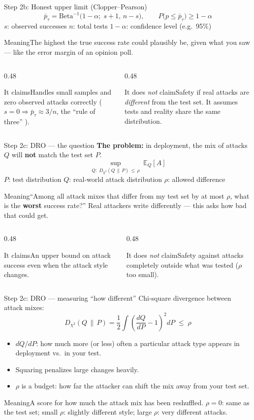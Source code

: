 \documentclass[aspectratio=169,11pt]{beamer}
\newcommand{\pbar}{\bar p_\tau}
\newcommand{\plain}[1]{\begin{block}{Meaning}#1\end{block}}
\newcommand{\claims}[2]{%
  \begin{columns}[T]
    \begin{column}{0.48\textwidth}
      \begin{exampleblock}{It claims}#1\end{exampleblock}
    \end{column}
    \begin{column}{0.48\textwidth}
      \begin{alertblock}{It does \emph{not} claim}#2\end{alertblock}
    \end{column}
  \end{columns}}
\begin{document}
\begin{frame}{Step 2b: Honest upper limit (Clopper--Pearson) \cite{clopper1934}}
  \[
    \pbar = \mathrm{Beta}^{-1}\big(1 - \alpha;\; s + 1,\, n - s\big),
    \qquad P\big(p \le \pbar\big) \ge 1 - \alpha
  \]
  \small
  $s$: observed successes \quad $n$: total tests \quad $1-\alpha$: confidence level (e.g.\ 95\%)
  \vspace{0.3em}
  \plain{The highest the true success rate could plausibly be, given what you saw --- like the error margin of an opinion poll.}
  \claims{Handles small samples and zero observed attacks correctly ($s=0 \Rightarrow \pbar \approx 3/n$, the ``rule of three'' \cite{hanley1983}).}
  {Safety if real attacks are \emph{different} from the test set. It assumes tests and reality share the same distribution.}
\end{frame}

\begin{frame}{Step 2c: DRO --- the question \cite{duchi2021dro,bental2013robust}}
  \textbf{The problem:} in deployment, the mix of attacks $Q$ will \textbf{not} match the test set $P$.
  \[
    \sup_{Q:\; D_{\chi^2}(Q\,\|\,P)\,\le\,\rho} \; \mathbb{E}_Q[A]
  \]
  \small
  $P$: test distribution \quad $Q$: real-world attack distribution \quad $\rho$: allowed difference
  \vspace{0.3em}
  \plain{``Among all attack mixes that differ from my test set by at most $\rho$, what is the \textbf{worst} success rate?'' Real attackers write differently --- this asks how bad that could get.}
  \claims{An upper bound on attack success even when the attack style changes.}
  {Safety against attacks completely outside what was tested ($\rho$ too small).}
\end{frame}

\begin{frame}{Step 2c: DRO --- measuring ``how different''}
  Chi-square divergence between attack mixes:
  \[
    D_{\chi^2}(Q\,\|\,P) = \frac{1}{2} \int \left(\frac{dQ}{dP} - 1\right)^{\!2} dP \;\le\; \rho
  \]
  \small
  \begin{itemize}
    \item $dQ/dP$: how much more (or less) often a particular attack type appears in deployment vs.\ in your test.
    \item Squaring penalizes large changes heavily.
    \item $\rho$ is a budget: how far the attacker can shift the mix away from your test set.
  \end{itemize}
  \plain{A score for how much the attack mix has been reshuffled. $\rho=0$: same as the test set; small $\rho$: slightly different style; large $\rho$: very different attacks.}
\end{frame}
\end{document}
